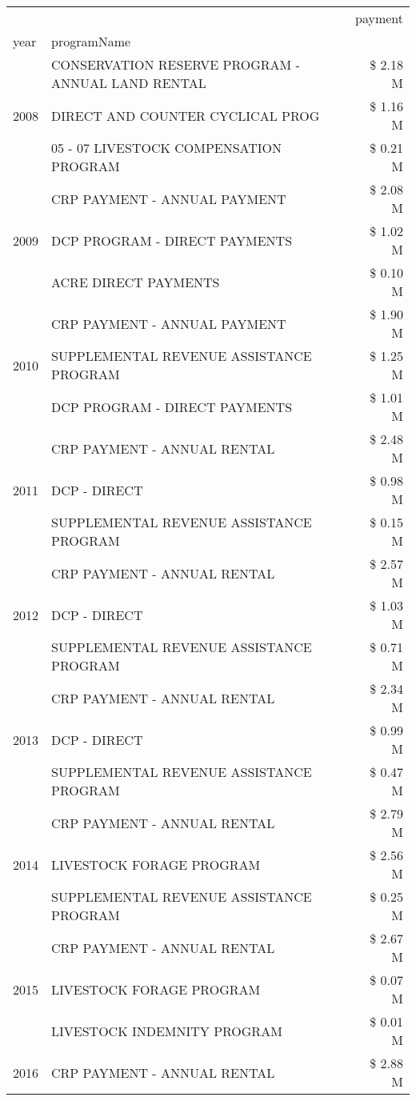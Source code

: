 \begin{tabular}{llr}
\toprule
 &  & payment \\
year & programName &  \\
\midrule
\multirow[t]{3}{*}{2008} & CONSERVATION RESERVE PROGRAM - ANNUAL LAND RENTAL & \$ 2.18 M \\
 & DIRECT AND COUNTER CYCLICAL PROG & \$ 1.16 M \\
 & 05 - 07 LIVESTOCK COMPENSATION PROGRAM & \$ 0.21 M \\
\cline{1-3}
\multirow[t]{3}{*}{2009} & CRP PAYMENT - ANNUAL PAYMENT & \$ 2.08 M \\
 & DCP PROGRAM - DIRECT PAYMENTS & \$ 1.02 M \\
 & ACRE DIRECT PAYMENTS & \$ 0.10 M \\
\cline{1-3}
\multirow[t]{3}{*}{2010} & CRP PAYMENT - ANNUAL PAYMENT & \$ 1.90 M \\
 & SUPPLEMENTAL REVENUE ASSISTANCE PROGRAM & \$ 1.25 M \\
 & DCP PROGRAM - DIRECT PAYMENTS & \$ 1.01 M \\
\cline{1-3}
\multirow[t]{3}{*}{2011} & CRP PAYMENT - ANNUAL RENTAL & \$ 2.48 M \\
 & DCP - DIRECT & \$ 0.98 M \\
 & SUPPLEMENTAL REVENUE ASSISTANCE PROGRAM & \$ 0.15 M \\
\cline{1-3}
\multirow[t]{3}{*}{2012} & CRP PAYMENT - ANNUAL RENTAL & \$ 2.57 M \\
 & DCP - DIRECT & \$ 1.03 M \\
 & SUPPLEMENTAL REVENUE ASSISTANCE PROGRAM & \$ 0.71 M \\
\cline{1-3}
\multirow[t]{3}{*}{2013} & CRP PAYMENT - ANNUAL RENTAL & \$ 2.34 M \\
 & DCP - DIRECT & \$ 0.99 M \\
 & SUPPLEMENTAL REVENUE ASSISTANCE PROGRAM & \$ 0.47 M \\
\cline{1-3}
\multirow[t]{3}{*}{2014} & CRP PAYMENT - ANNUAL RENTAL & \$ 2.79 M \\
 & LIVESTOCK FORAGE PROGRAM & \$ 2.56 M \\
 & SUPPLEMENTAL REVENUE ASSISTANCE PROGRAM & \$ 0.25 M \\
\cline{1-3}
\multirow[t]{3}{*}{2015} & CRP PAYMENT - ANNUAL RENTAL & \$ 2.67 M \\
 & LIVESTOCK FORAGE PROGRAM & \$ 0.07 M \\
 & LIVESTOCK INDEMNITY PROGRAM & \$ 0.01 M \\
\cline{1-3}
\multirow[t]{3}{*}{2016} & CRP PAYMENT - ANNUAL RENTAL & \$ 2.88 M \\

\end{tabular}
